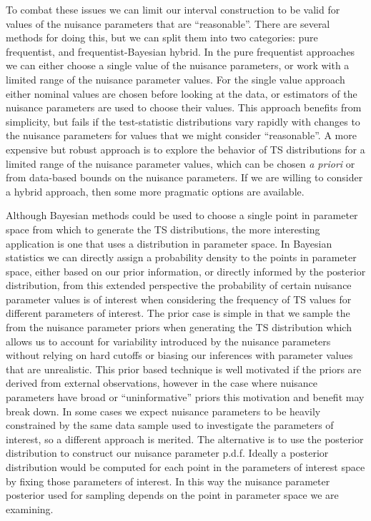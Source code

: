 To combat these issues we can limit our interval construction to be valid for values of the nuisance parameters that are ``reasonable''.
There are several methods for doing this, but we can split them into two categories: pure frequentist, and frequentist-Bayesian hybrid.
In the pure frequentist approaches we can either choose a single value of the nuisance parameters, or work with a limited range of the nuisance parameter values.
For the single value approach either nominal values are chosen before looking at the data, or estimators of the nuisance parameters are used to choose their values.
This approach benefits from simplicity, but fails if the test-statistic distributions vary rapidly with changes to the nuisance parameters for values that we might consider ``reasonable''.
A more expensive but robust approach is to explore the behavior of TS distributions for a limited range of the nuisance parameter values, which can be chosen {\it a priori} or from data-based bounds on the nuisance parameters.
If we are willing to consider a hybrid approach, then some more pragmatic options are available.

Although Bayesian methods could be used to choose a single point in parameter space from which to generate the TS distributions, the more interesting application is one that uses a distribution in parameter space.
In Bayesian statistics we can directly assign a probability density to the points in parameter space, either based on our prior information, or directly informed by the posterior distribution, from this extended perspective the probability of certain nuisance parameter values is of interest when considering the frequency of TS values for different parameters of interest.
The prior case is simple in that we sample the from the nuisance parameter priors when generating the TS distribution which allows us to account for variability introduced by the nuisance parameters without relying on hard cutoffs or biasing our inferences with parameter values that are unrealistic.
This prior based technique is well motivated if the priors are derived from external observations, however in the case where nuisance parameters have broad or ``uninformative'' priors this motivation and benefit may break down.
In some cases we expect nuisance parameters to be heavily constrained by the same data sample used to investigate the parameters of interest, so a different approach is merited.
The alternative is to use the posterior distribution to construct our nuisance parameter p.d.f.
Ideally a posterior distribution would be computed for each point in the parameters of interest space by fixing those parameters of interest.
In this way the nuisance parameter posterior used for sampling depends on the point in parameter space we are examining.


